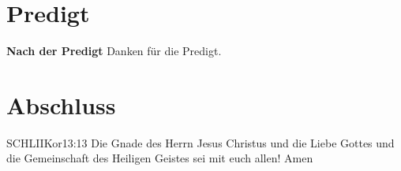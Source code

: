 \documentclass[fontsize=14pt]{mybib}
\begin{document}
\section{Predigt}
\textbf{Nach der Predigt}\newline
Danken für die Predigt.\newline

\section{Abschluss}


\beten{}

\begin{bibelbox}{SCHL}{IIKor}{13:13}
    Die Gnade des Herrn Jesus Christus und die Liebe Gottes und die Gemeinschaft des Heiligen Geistes sei mit euch allen! Amen
\end{bibelbox}
\end{document}
